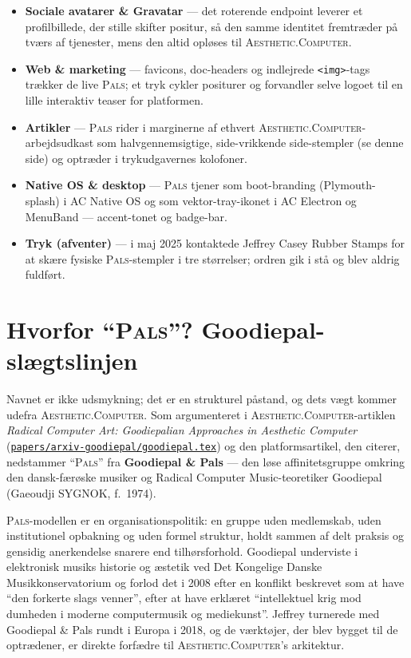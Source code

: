 \documentclass[10pt,letterpaper,twocolumn]{article}
\newcommand{\ac}{\textsc{Aesthetic}{\color{acpink}.}\textsc{Computer}}
\newcommand{\pals}{\textsc{Pals}}
\newcommand{\repofile}[1]{\href{https://github.com/whistlegraph/aesthetic-computer/blob/main/#1}{\texttt{#1}}}
\begin{document}
\begin{itemize}
  \item \textbf{Sociale avatarer \& Gravatar} --- det roterende endpoint
        leverer et profilbillede, der stille skifter positur, så den samme
        identitet fremtræder på tværs af tjenester, mens den altid opløses
        til \ac{}.
  \item \textbf{Web \& marketing} --- favicons, doc-headers og indlejrede
        \texttt{<img>}-tags trækker de live \pals{}; et tryk cykler
        positurer og forvandler selve logoet til en lille interaktiv
        teaser for platformen.
  \item \textbf{Artikler} --- \pals{} rider i marginerne af ethvert
        \ac{}-arbejdsudkast som halvgennemsigtige, side-vrikkende
        side-stempler (se denne side) og optræder i tryk\-udgavernes
        kolofoner.
  \item \textbf{Native OS \& desktop} --- \pals{} tjener som boot-branding
        (Plymouth-splash) i AC Native OS og som vektor-tray-ikonet i AC
        Electron og MenuBand --- accent-tonet og badge-bar.
  \item \textbf{Tryk (afventer)} --- i maj 2025 kontaktede Jeffrey Casey
        Rubber Stamps for at skære fysiske \pals{}-stempler i tre
        størrelser; ordren gik i stå og blev aldrig fuldført.
\end{itemize}

\section{Hvorfor ``\pals{}''? Goodiepal-slægtslinjen}

Navnet er ikke udsmykning; det er en strukturel påstand, og dets vægt
kommer udefra \ac{}. Som argumenteret i \ac{}-artiklen
\emph{Radical Computer Art: Goodiepalian Approaches in Aesthetic
Computer} (\repofile{papers/arxiv-goodiepal/goodiepal.tex}) og den
platformsartikel, den citerer, nedstammer ``\pals{}'' fra \textbf{Goodiepal
\& Pals} --- den løse affinitetsgruppe omkring den dansk-færøske musiker og
Radical Computer Music-teoretiker Goodiepal (Gaeoudji SYGNOK, f.~1974).

\pals{}-modellen er en organisationspolitik: en gruppe uden medlemskab,
uden institutionel opbakning og uden formel struktur, holdt sammen af delt
praksis og gensidig anerkendelse snarere end tilhørsforhold. Goodiepal
underviste i elektronisk musiks historie og æstetik ved Det Kongelige
Danske Musikkonservatorium og forlod det i 2008 efter en konflikt beskrevet
som at have ``den forkerte slags venner'', efter at have erklæret
``intellektuel krig mod dumheden i moderne computermusik og mediekunst''.
Jeffrey turnerede med Goodiepal \& Pals rundt i Europa i 2018, og de
værktøjer, der blev bygget til de optrædener, er direkte forfædre til
\ac{}'s arkitektur.
\end{document}
